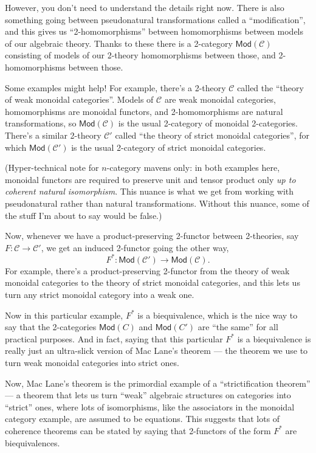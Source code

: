 \documentclass{article}
\begin{document}
However, you don't need to understand the details right now. There is
also something going between pseudonatural transformations called a
``modification'', and this gives us ``2-homomorphisms'' between
homomorphisms between models of our algebraic theory. Thanks to these
there is a 2-category \(\mathsf{Mod}(\mathcal{C})\) consisting of models
of our 2-theory homomorphisms between those, and 2-homomorphisms between
those.

Some examples might help! For example, there's a 2-theory
\(\mathcal{C}\) called the ``theory of weak monoidal categories''.
Models of \(\mathcal{C}\) are weak monoidal categories, homomorphisms
are monoidal functors, and 2-homomorphisms are natural transformations,
so \(\mathsf{Mod}(\mathcal{C})\) is the usual 2-category of monoidal
2-categories. There's a similar 2-theory \(\mathcal{C}'\) called ``the
theory of strict monoidal categories'', for which
\(\mathsf{Mod}(\mathcal{C}')\) is the usual 2-category of strict
monoidal categories.

(Hyper-technical note for \(n\)-category mavens only: in both examples
here, monoidal functors are required to preserve unit and tensor product
only \emph{up to coherent natural isomorphism}. This nuance is what we
get from working with pseudonatural rather than natural transformations.
Without this nuance, some of the stuff I'm about to say would be false.)

Now, whenever we have a product-preserving 2-functor between 2-theories,
say \(F\colon\mathcal{C}\to\mathcal{C}'\), we get an induced 2-functor
going the other way,
\[F^*\colon\mathsf{Mod}(\mathcal{C}')\to\mathsf{Mod}(\mathcal{C}).\] For
example, there's a product-preserving 2-functor from the theory of weak
monoidal categories to the theory of strict monoidal categories, and
this lets us turn any strict monoidal category into a weak one.

Now in this particular example, \(F^*\) is a biequivalence, which is the
nice way to say that the 2-categories \(\mathsf{Mod}(C)\) and
\(\mathsf{Mod}(C')\) are ``the same'' for all practical purposes. And in
fact, saying that this particular \(F^*\) is a biequivalence is really
just an ultra-slick version of Mac Lane's theorem --- the theorem we use
to turn weak monoidal categories into strict ones.

Now, Mac Lane's theorem is the primordial example of a ``strictification
theorem'' --- a theorem that lets us turn ``weak'' algebraic structures
on categories into ``strict'' ones, where lots of isomorphisms, like the
associators in the monoidal category example, are assumed to be
equations. This suggests that lots of coherence theorems can be stated
by saying that 2-functors of the form \(F^*\) are biequivalences.
\end{document}
